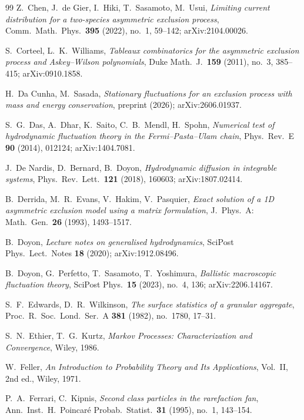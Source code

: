 \documentclass[11pt]{article}
\theoremstyle{plain}
\theoremstyle{definition}
\theoremstyle{remark}
\begin{document}
\begin{thebibliography}{99}
 Z.~Chen, J.~de Gier, I.~Hiki, T.~Sasamoto, M.~Usui, \emph{Limiting
current distribution for a two-species asymmetric exclusion process},
Comm.~Math.~Phys.~\textbf{395} (2022), no.~1, 59--142; arXiv:2104.00026.

 S.~Corteel, L.~K.~Williams, \emph{Tableaux combinatorics
for the asymmetric exclusion process and Askey--Wilson polynomials}, Duke
Math.~J.~\textbf{159} (2011), no.~3, 385--415; arXiv:0910.1858.

 H.~Da Cunha, M.~Sasada, \emph{Stationary fluctuations for an
exclusion process with mass and energy conservation}, preprint (2026); arXiv:2606.01937.

 S.~G.~Das, A.~Dhar, K.~Saito, C.~B.~Mendl, H.~Spohn, \emph{Numerical
test of hydrodynamic fluctuation theory in the Fermi--Pasta--Ulam chain},
Phys.~Rev.~E \textbf{90} (2014), 012124; arXiv:1404.7081.

 J.~De Nardis, D.~Bernard, B.~Doyon, \emph{Hydrodynamic diffusion in
integrable systems}, Phys.~Rev.~Lett.~\textbf{121} (2018), 160603; arXiv:1807.02414.

 B.~Derrida, M.~R.~Evans, V.~Hakim, V.~Pasquier, \emph{Exact solution
of a 1D asymmetric exclusion model using a matrix formulation}, J.~Phys.~A:
Math.~Gen.~\textbf{26} (1993), 1493--1517.

 B.~Doyon, \emph{Lecture notes on generalised hydrodynamics},
SciPost Phys.~Lect.~Notes \textbf{18} (2020); arXiv:1912.08496.

 B.~Doyon, G.~Perfetto, T.~Sasamoto, T.~Yoshimura, \emph{Ballistic
macroscopic fluctuation theory}, SciPost Phys.~\textbf{15} (2023), no.~4, 136;
arXiv:2206.14167.

 S.~F.~Edwards, D.~R.~Wilkinson, \emph{The surface statistics of a granular
aggregate}, Proc.~R.~Soc.~Lond.~Ser.~A \textbf{381} (1982), no.~1780, 17--31.

 S.~N.~Ethier, T.~G.~Kurtz, \emph{Markov Processes: Characterization and
Convergence}, Wiley, 1986.

 W.~Feller, \emph{An Introduction to Probability Theory and Its
Applications}, Vol.~II, 2nd ed., Wiley, 1971.

 P.~A.~Ferrari, C.~Kipnis, \emph{Second class particles in
the rarefaction fan}, Ann.~Inst.~H.~Poincar\'e Probab.~Statist.~\textbf{31}
(1995), no.~1, 143--154.


\end{thebibliography}
\end{document}
